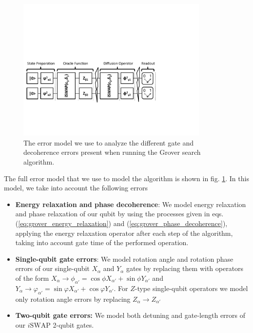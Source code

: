 \begin{figure}[ht!]
	\centering
		\includegraphics[width=0.85\textwidth]{"./material/papers/grover/grover_error_model"}
	\caption[Error model used for analyzing gate and decoherence errors for the Grover search algorithm]{The error model we use to analyze the different gate and decoherence errors present when running the Grover search algorithm.}
	\label{fig:GroverErrorModel}
\end{figure}


The full error model that we use to model the algorithm is shown in fig. \ref{fig:GroverErrorModel}. In this model, we take into account the following errors

\begin{itemize}
 \item {\bf Energy relaxation and phase decoherence}: We model energy relaxation and phase relaxation of our qubit by using the processes given in eqs. (\ref{eq:grover_energy_relaxation}) and (\ref{eq:grover_phase_decoherence}), applying the energy relaxation operator after each step of the algorithm, taking into account gate time of the performed operation.
 \item {\bf Single-qubit gate errors}: We model rotation angle and rotation phase errors of our single-qubit $X_\alpha$ and $Y_\alpha$ gates by replacing them with operators of the form $X_\alpha\to \phi_{\alpha'} = \cos{\phi}X_{\alpha'}+\sin{\phi}Y_{\alpha'}$ and $Y_\alpha \to \varphi_{\alpha'} = \sin{\varphi}X_{\alpha'}+\cos{\varphi}Y_{\alpha'}$. For $Z$-type single-qubit operators we model only rotation angle errors by replacing $Z_\alpha \to Z_{\alpha'}$ 
 \item {\bf Two-qubit gate errors:} We model both detuning and gate-length errors of our $i\mathrm{SWAP}$ 2-qubit gates.
\end{itemize}

